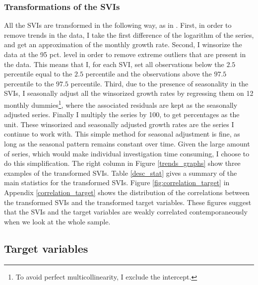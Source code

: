 \subsubsection{Transformations of the SVIs}\label{svi_transformations}

All the SVIs are transformed in the following way, as in \textcite{da2015}. First, in order to remove trends in the data, I take the first difference of the logarithm of the series, and get an approximation of the monthly growth rate. Second, I winsorize the data at the 95 pct. level in order to remove extreme outliers that are present in the data. This means that I, for each SVI, set all observations below the $2.5$ percentile equal to the $2.5$ percentile and the observations above the $97.5$ percentile to the $97.5$ percentile. Third, due to the presence of seasonality in the SVIs, I seasonally adjust all the winsorized growth rates by regressing them on 12 monthly dummies\footnote{To avoid perfect multicollinearity, I exclude the intercept.}, where the associated residuals are kept as the seasonally adjusted series. Finally I multiply the series by 100, to get percentages as the unit. These winsorized and seasonally adjusted growth rates are the series I continue to work with. This simple method for seasonal adjustment is fine, as long as the seasonal pattern remains constant over time. Given the large amount of series, which would make individual investigation time consuming, I choose to do this simplification. The right column in Figure \ref{trends_graphs} show three examples of the transformed SVIs. Table \ref{desc_stat} gives a summary of the main statistics for the transformed SVIs. Figure \ref{fig:correlation_target} in Appendix \ref{correlation_target} shows the distribution of the correlations between the transformed SVIs and the transformed target variables. These figures suggest that the SVIs and the target variables are weakly correlated contemporaneously when we look at the whole sample.

\subsection{Target variables}\label{target}

